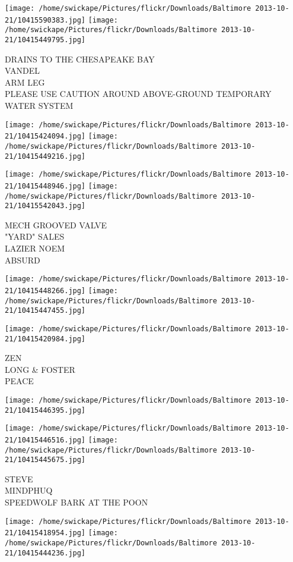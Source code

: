 \documentclass[10pt,letterpaper]{article}
\begin{document}
\texttt{[image: /home/swickape/Pictures/flickr/Downloads/Baltimore 2013-10-21/10415590383.jpg]}
\texttt{[image: /home/swickape/Pictures/flickr/Downloads/Baltimore 2013-10-21/10415449795.jpg]}

DRAINS TO THE CHESAPEAKE BAY\\
VANDEL\\
ARM LEG\\
PLEASE USE CAUTION AROUND ABOVE{-}GROUND TEMPORARY WATER SYSTEM
\pagebreak

\texttt{[image: /home/swickape/Pictures/flickr/Downloads/Baltimore 2013-10-21/10415424094.jpg]}
\texttt{[image: /home/swickape/Pictures/flickr/Downloads/Baltimore 2013-10-21/10415449216.jpg]}

\texttt{[image: /home/swickape/Pictures/flickr/Downloads/Baltimore 2013-10-21/10415448946.jpg]}
\texttt{[image: /home/swickape/Pictures/flickr/Downloads/Baltimore 2013-10-21/10415542043.jpg]}

MECH GROOVED VALVE\\
"YARD" SALES\\
LAZIER NOEM\\
ABSURD
\pagebreak

\texttt{[image: /home/swickape/Pictures/flickr/Downloads/Baltimore 2013-10-21/10415448266.jpg]}
\texttt{[image: /home/swickape/Pictures/flickr/Downloads/Baltimore 2013-10-21/10415447455.jpg]}

\texttt{[image: /home/swickape/Pictures/flickr/Downloads/Baltimore 2013-10-21/10415420984.jpg]}

ZEN\\
LONG \& FOSTER\\
PEACE
\pagebreak

\texttt{[image: /home/swickape/Pictures/flickr/Downloads/Baltimore 2013-10-21/10415446395.jpg]}

\vspace{0.25in}
\texttt{[image: /home/swickape/Pictures/flickr/Downloads/Baltimore 2013-10-21/10415446516.jpg]}
\texttt{[image: /home/swickape/Pictures/flickr/Downloads/Baltimore 2013-10-21/10415445675.jpg]}

STEVE\\
MINDPHUQ\\
SPEEDWOLF BARK AT THE POON
\pagebreak

\texttt{[image: /home/swickape/Pictures/flickr/Downloads/Baltimore 2013-10-21/10415418954.jpg]}
\texttt{[image: /home/swickape/Pictures/flickr/Downloads/Baltimore 2013-10-21/10415444236.jpg]}
\end{document}
